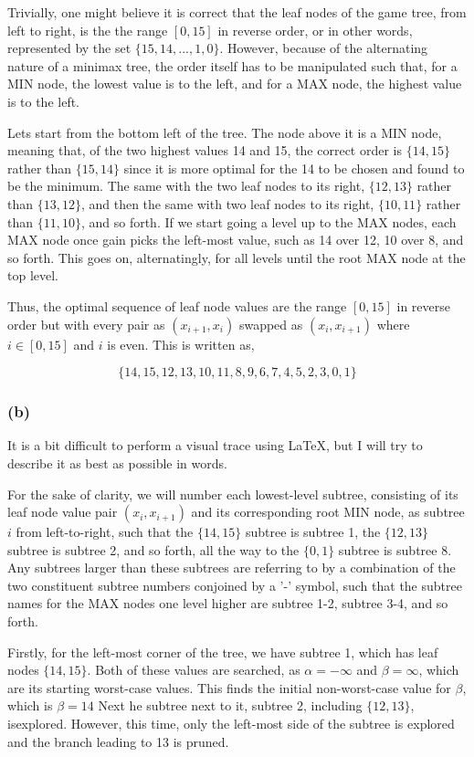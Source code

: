 \documentclass{article}
\begin{document}
Trivially, one might believe it is correct that the leaf nodes of the game tree, from left to right, is the the range $[0, 15]$ in reverse order, or in other words, represented by the set $\{15, 14, ..., 1, 0\}$. However, because of the alternating nature of a minimax tree, the order itself has to be manipulated such that, for a MIN node, the lowest value is to the left, and for a MAX node, the highest value is to the left.

Lets start from the bottom left of the tree. The node above it is a MIN node, meaning that, of the two highest values 14 and 15, the correct order is $\{14, 15\}$ rather than $\{15, 14\}$ since it is more optimal for the 14 to be chosen and found to be the minimum. The same with the two leaf nodes to its right, $\{12, 13\}$ rather than $\{13, 12\}$, and then the same with two leaf nodes to its right, $\{10, 11\}$ rather than $\{11, 10\}$, and so forth. If we start going a level up to the MAX nodes, each MAX node once gain picks the left-most value, such as 14 over 12, 10 over 8, and so forth. This goes on, alternatingly, for all levels until the root MAX node at the top level.

Thus, the optimal sequence of leaf node values are the range $[0, 15]$ in reverse order but with every pair as $(x_{i+1}, x_i)$ swapped as $(x_i, x_{i+1})$ where $i \in [0, 15]$ and $i$ is even. This is written as,

$$\{14, 15, 12, 13, 10, 11, 8, 9, 6, 7, 4, 5, 2, 3, 0, 1\}$$

\subsubsection*{(b)}
It is a bit difficult to perform a visual trace using LaTeX, but I will try to describe it as best as possible in words.

For the sake of clarity, we will number each lowest-level subtree, consisting of its leaf node value pair $(x_i, x_{i+1})$ and its corresponding root MIN node, as subtree $i$ from left-to-right, such that the $\{14, 15\}$ subtree is subtree 1, the $\{12, 13\}$ subtree is subtree 2, and so forth, all the way to the $\{0, 1\}$ subtree is subtree 8. Any subtrees larger than these subtrees are referring to by a combination of the two constituent subtree numbers conjoined by a '-' symbol, such that the subtree names for the MAX nodes one level higher are subtree 1-2, subtree 3-4, and so forth.

Firstly, for the left-most corner of the tree, we have subtree 1, which has leaf nodes $\{14, 15\}$. Both of these values are searched, as $\alpha = -\infty$ and $\beta = \infty$, which are its starting worst-case values. This finds the initial non-worst-case value for $\beta$, which is $\beta = 14$ Next he subtree next to it, subtree 2, including $\{12, 13\}$, isexplored. However, this time, only the left-most side of the subtree is explored and the branch leading to 13 is pruned.
\end{document}
